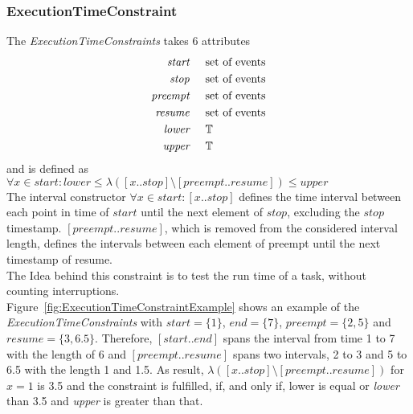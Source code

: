 		
	\subsubsection{ExecutionTimeConstraint}
		The \emph{ExecutionTimeConstraints} takes 6 attributes
		\begin{align*}
			\emph{start} & \hspace{.5cm}\text{set of events}\\
			\emph{stop} & \hspace{.5cm}\text{set of events}\\
			\emph{preempt} & \hspace{.5cm}\text{set of events}\\
			\emph{resume} & \hspace{.5cm}\text{set of events}\\
			\emph{lower} & \hspace{.5cm}\mathbb{T}\\
			\emph{upper} & \hspace{.5cm}\mathbb{T}\\
		\end{align*}
		and is defined as\\[10pt]
		\begin{math}
			\forall x\in start: lower\leq \lambda([x..stop]\setminus[preempt..resume]) \leq upper
		\end{math}\\[10pt]
		The interval constructor $\forall x\in start: [x..stop]$ defines the time interval between each point in time of $start$ until the next element of $stop$, excluding the $stop$ timestamp. $[preempt..resume]$, which is removed from the considered interval length, defines the intervals between each element of preempt until the next timestamp of resume.\\
		The Idea behind this constraint is to test the run time of a task, without counting interruptions.\\
		Figure~\ref{fig:ExecutionTimeConstraintExample} shows an example of the \emph{ExecutionTimeConstraints} with $start=\{1\}$, $end=\{7\}$, $preempt=\{2, 5\}$ and $resume = \{3, 6.5\}$. Therefore, $[start..end]$ spans the interval from time 1 to 7 with the length of 6 and $[preempt..resume]$ spans two intervals, 2 to 3 and 5 to 6.5 with the length 1 and 1.5. As result, $\lambda([x..stop]\setminus[preempt..resume])$ for $x = 1$ is 3.5 and the constraint is fulfilled, if, and only if, lower is equal or \emph{lower} than 3.5 and \emph{upper} is greater than that.\\
